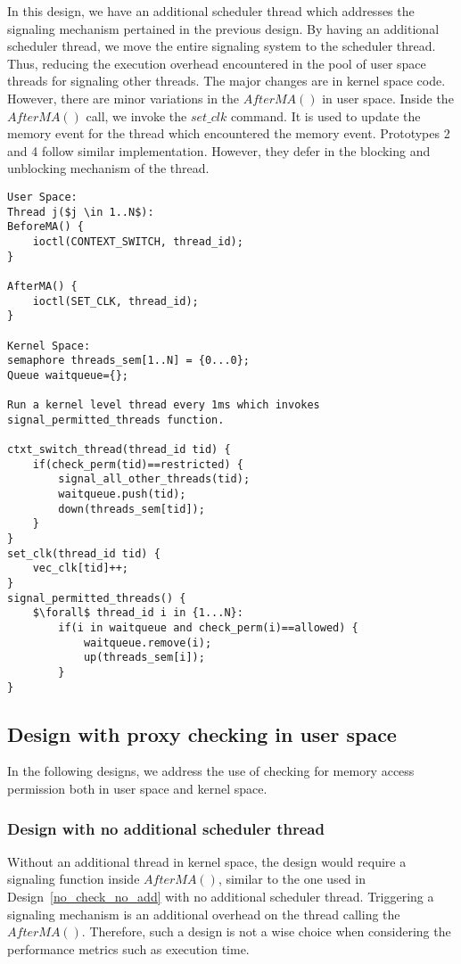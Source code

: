 In this design, we have an additional scheduler thread which addresses the signaling mechanism pertained in the previous design. 
By having an additional scheduler thread, we move the entire signaling system to the scheduler thread.
Thus, reducing the execution overhead encountered in the pool of user space threads for signaling other threads.
The major changes are in kernel space code. 
However, there are minor variations in the $AfterMA()$ in user space. 
Inside the $AfterMA()$ call, we invoke the $set\_clk$ command. 
It is used to update the memory event for the thread which encountered the memory event. 
Prototypes 2 and 4 follow similar implementation. 
However, they defer in the blocking and unblocking mechanism of the thread. 
\begin{lstlisting}[mathescape=true,caption={Pseudo Code for Prototype 2}, style=customc,frame=tlrb,label={lst:proto2}]
User Space:
Thread j($j \in 1..N$):
BeforeMA() {	
	ioctl(CONTEXT_SWITCH, thread_id);	
}

AfterMA() {	
	ioctl(SET_CLK, thread_id);
}

Kernel Space:
semaphore threads_sem[1..N] = {0...0};
Queue waitqueue={};

Run a kernel level thread every 1ms which invokes signal_permitted_threads function.

ctxt_switch_thread(thread_id tid) {	
	if(check_perm(tid)==restricted) {
		signal_all_other_threads(tid);
		waitqueue.push(tid);
		down(threads_sem[tid]); 
	}
}
set_clk(thread_id tid) {
	vec_clk[tid]++;
}
signal_permitted_threads() {
	$\forall$ thread_id i in {1...N}:
		if(i in waitqueue and check_perm(i)==allowed) {
			waitqueue.remove(i);
			up(threads_sem[i]);
		}
}
\end{lstlisting}

\subsection{Design with proxy checking in user space\label{proxycheck}}

In the following designs, we address the use of checking for memory access permission both in user space and kernel space.

\subsubsection{Design with no additional scheduler thread}

Without an additional thread in kernel space, the design would require a signaling function inside $AfterMA()$, similar to the one used in Design~\ref{no_check_no_add} with no additional scheduler thread. 
Triggering a signaling mechanism is an additional overhead on the thread calling the $AfterMA()$. 
Therefore, such a design is not a wise choice when considering the performance metrics such as execution time.
 
